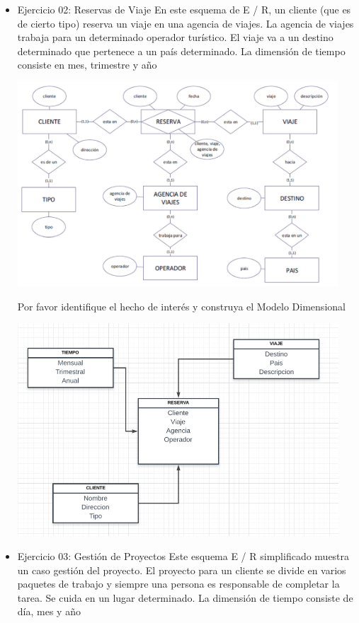 \documentclass[preprint,12pt]{elsarticle}
\begin{document}
\begin{itemize}
\item Ejercicio 02: Reservas de Viaje
En este esquema de E / R, un cliente (que es de cierto tipo) reserva un viaje en una agencia de viajes. La agencia de viajes
trabaja para un determinado operador turístico. El viaje va a un destino determinado que pertenece a un país determinado.
La dimensión de tiempo consiste en mes, trimestre y año

\begin{center}
	\includegraphics[width=12cm]{./Imagenes/MODELO_ER_2} 
\end{center}

Por favor identifique el hecho de interés y construya el Modelo Dimensional


\begin{center}
	\includegraphics[width=12cm]{./Imagenes/MODELO_D_2} 
\end{center}


\item Ejercicio 03: Gestión de Proyectos 
Este esquema E / R simplificado muestra un caso gestión del proyecto.
El proyecto para un cliente se divide en varios paquetes de trabajo y siempre una persona es responsable de completar la
tarea. Se cuida en un lugar determinado.
La dimensión de tiempo consiste de día, mes y año



\end{itemize}
\end{document}
